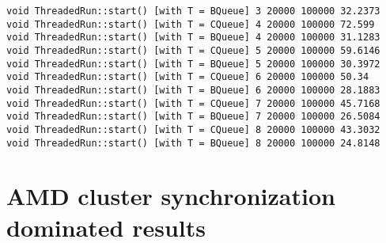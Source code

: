 \begin{verbatim}
void ThreadedRun::start() [with T = BQueue] 3 20000 100000 32.2373
void ThreadedRun::start() [with T = CQueue] 4 20000 100000 72.599
void ThreadedRun::start() [with T = BQueue] 4 20000 100000 31.1283
void ThreadedRun::start() [with T = CQueue] 5 20000 100000 59.6146
void ThreadedRun::start() [with T = BQueue] 5 20000 100000 30.3972
void ThreadedRun::start() [with T = CQueue] 6 20000 100000 50.34
void ThreadedRun::start() [with T = BQueue] 6 20000 100000 28.1883
void ThreadedRun::start() [with T = CQueue] 7 20000 100000 45.7168
void ThreadedRun::start() [with T = BQueue] 7 20000 100000 26.5084
void ThreadedRun::start() [with T = CQueue] 8 20000 100000 43.3032
void ThreadedRun::start() [with T = BQueue] 8 20000 100000 24.8148
\end{verbatim}

\section{AMD cluster synchronization dominated results}
\small
